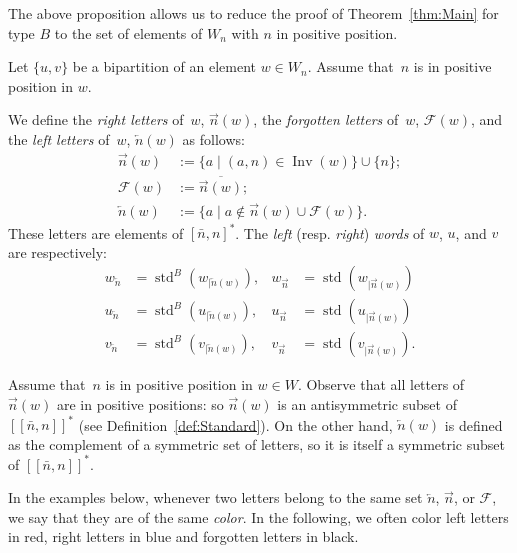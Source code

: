 \documentclass[Unicode]{cedram-alco}
\theoremstyle{definition}
\DeclareMathOperator{\std}{std}
\newcommand{\rest}[2]{#1_{|#2}}
\newcommand{\srest}[2]{\std(#1_{|#2})}
\DeclareMathOperator{\invs}{Inv}
\newcommand{\R}{{\overrightarrow{n}}}
\newcommand{\LL}{{\overleftarrow{n}}}
\newcommand{\Bsetnn}{[\![\bar{n},n ]\!]^*}
\newcommand{\Bstd}{\std^{B}}
\newcommand{\Bsrest}[2]{\Bstd(\rest{#1}{#2})}
\newcommand{\F}{\mathcal{F}}
\begin{document}
The above proposition allows us to reduce the proof of Theorem~\ref{thm:Main}  for type $B$ to the set of elements of $W_n$ with $n$ in positive position. 

\begin{defi}
\label{def:Bdecomp}
Let $\lbrace u, v \rbrace$ be a bipartition of an element $w \in W_n$. Assume that~$n$ is in positive position in $w$. 

We define the \emph{right letters} of~$w$, $\R(w)$, the \emph{forgotten letters} of~$w$, $\F(w)$, and the \emph{left letters} of~$w$, $\LL(w)$  as follows:
\begin{align*}
\R(w) &:= \lbrace a\mid (a,n) \in \invs(w) \rbrace \cup \lbrace n \rbrace; \\
\F(w) &:= \overline{\R(w)}; \\
\LL(w) &:= \lbrace a \mid a \not\in \R(w) \cup \F(w) \rbrace.
\end{align*}
These letters are elements of $[\bar n,n]^*$. The {\em left} (resp. {\em right}) {\em words} of $w$, $u$, and $v$ are respectively:
\begin{align*}
w_\LL &= \Bsrest{w}{\LL(w)}, & w_\R &= \srest{w}{\R(w)} \\
u_\LL &= \Bsrest{u}{\LL(w)}, & u_\R &= \srest{u}{\R(w)} \\
v_\LL &= \Bsrest{v}{\LL(w)}, & v_\R &= \srest{v}{\R(w)}. 
\end{align*}
\end{defi}

\begin{remark}  Assume that~$n$ is in positive position in $w\in W$. Observe that   all letters of $\R(w)$ are in positive positions: so $\R(w)$ is an antisymmetric subset of $\Bsetnn$ (see Definition~\ref{def:Standard}). On the other hand, $\LL(w)$ is defined as the complement of a symmetric set of letters, so it is itself a symmetric subset of $\Bsetnn$. 
\end{remark}

In the examples below,  whenever two letters belong to the same set $\LL$, $\R$, or $\F$, we say that they are of the same \emph{color}. In the following, we often color left letters in red, right letters in blue and forgotten letters in black.
\end{document}
